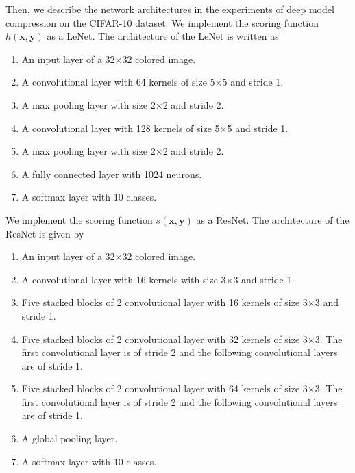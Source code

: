 \documentclass{article}
\newcommand{\OVEC}[1]{\bm{#1}} %
\newcommand{\stdscore}{h(\OVEC{x},\OVEC{y})}
\newcommand{\priscore}{s(\OVEC{x},\OVEC{y})}
\begin{document}
Then, we describe the network architectures in the experiments of deep model compression on the CIFAR-10 dataset.
We implement the scoring function $\stdscore$ as a LeNet.
The architecture of the LeNet is written as
\begin{enumerate}
\item An input layer of a 32$\times$32 colored image.
\item A convolutional layer with 64 kernels of size 5$\times$5 and stride 1.
\item A max pooling layer with size 2$\times$2 and stride 2.
\item A convolutional layer with 128 kernels of size 5$\times$5 and stride 1.
\item A max pooling layer with size 2$\times$2 and stride 2.
\item A fully connected layer with 1024 neurons.
\item A softmax layer with 10 classes.
\end{enumerate}
We implement the scoring function $\priscore$ as a ResNet.
The architecture of the ResNet is given by
\begin{enumerate}
\item An input layer of a 32$\times$32 colored image.
\item A convolutional layer with 16 kernels with size 3$\times$3 and stride 1.
\item Five stacked blocks of 2 convolutional layer with 16 kernels of size 3$\times$3 and stride 1.
\item Five stacked blocks of 2 convolutional layer with 32 kernels of size 3$\times$3.
The first convolutional layer is of stride 2 and the following convolutional layers are of stride 1.
\item Five stacked blocks of 2 convolutional layer with 64 kernels of size 3$\times$3.
The first convolutional layer is of stride 2 and the following convolutional layers are of stride 1.
\item A global pooling layer.
\item A softmax layer with 10 classes.
\end{enumerate}
\end{document}
